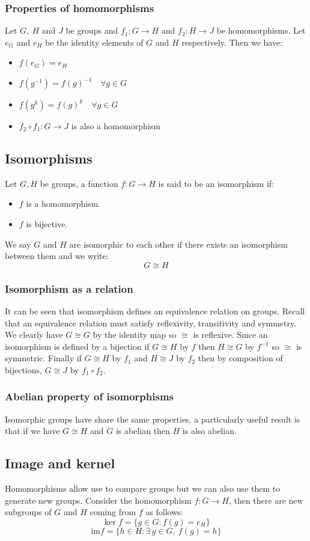 \documentclass[12pt]{article}
\begin{document}
\subsubsection*{Properties of homomorphisms}
Let \(G,\ H\) and \(J\) be groups and \(f_1:G\to H\) and \(f_2:H\to J\) be homomorphisms. Let \(e_G\) and \(e_H\) be the identity elements of \(G\) and \(H\) respectively. Then we have:
\begin{itemize}
    \item \(f(e_G)=e_H\)
    \item \(f(g^{-1})=f(g)^{-1}\quad \forall g\in G\)
    \item \(f(g^k)=f(g)^k\quad \forall g\in G\)
    \item \(f_2\circ f_1: G\to J\) is also a homomorphism
\end{itemize}
\subsection*{Isomorphisms}
Let \(G,H\) be groups, a function \(f:G\to H\) is said to be an isomorphism if:
\begin{itemize}
    \item \(f\) is a homomorphism.
    \item \(f\) is bijective.
\end{itemize}
We say \(G\) and \(H\) are isomorphic to each other if there exists an isomorphism between them and we write:
\[G\cong H\]
\subsubsection*{Isomorphism as a relation}
It can be seen that isomorphism defines an equivalence relation on groups. Recall that an equivalence relation must satisfy reflexivity, transitivity and symmetry. We clearly have \(G\cong G\) by the identity map so \(\cong\) is reflexive. Since an isomorphism is defined by a bijection if \(G\cong H\) by \(f\) then \(H\cong G\) by \(f^{-1}\) so \(\cong\) is symmetric. Finally if \(G\cong H\) by \(f_1\) and \(H\cong J\) by \(f_2\) then by composition of bijections,  \(G\cong J\) by \(f_1\circ f_2\).
\subsubsection*{Abelian property of isomorphisms}
Isomorphic groups have share the same properties, a particularly useful result is that if we have \(G\cong H\) and \(G\) is abelian then \(H\) is also abelian.
\subsection*{Image and kernel}
Homomorphisms allow use to compare groups but we can also use them to generate new groups. Consider the homomorphism \(f:G\to H\), then there are new subgroups of \(G\) and \(H\) coming from \(f\) as follows:
\[\ker f=\{g\in G: f(g)=e_H\}\]
\[\text{im} f=\{h\in H:\exists\, g\in G,\ f(g)=h \}\]
\end{document}
